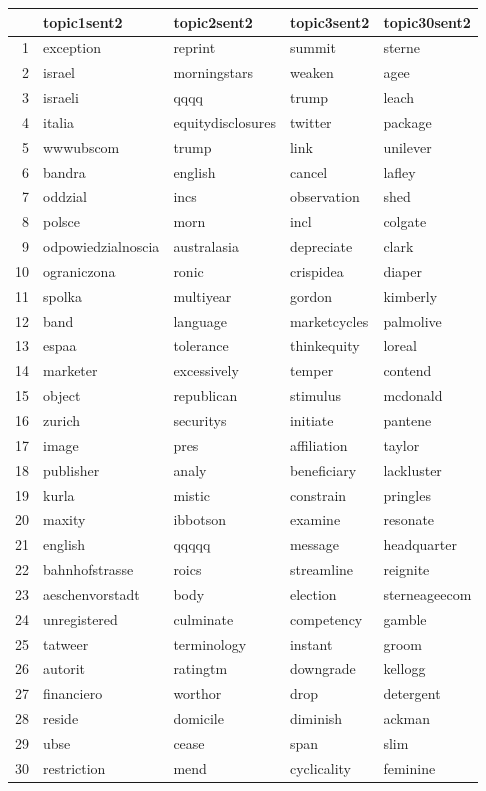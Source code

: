 \begin{table}[ht]
\centering
\begin{tabular}{rllll}
  \hline
 & topic1sent2 & topic2sent2 & topic3sent2 & topic30sent2 \\ 
  \hline
1 & exception & reprint & summit & sterne \\ 
  2 & israel & morningstars & weaken & agee \\ 
  3 & israeli & qqqq & trump & leach \\ 
  4 & italia & equitydisclosures & twitter & package \\ 
  5 & wwwubscom & trump & link & unilever \\ 
  6 & bandra & english & cancel & lafley \\ 
  7 & oddzial & incs & observation & shed \\ 
  8 & polsce & morn & incl & colgate \\ 
  9 & odpowiedzialnoscia & australasia & depreciate & clark \\ 
  10 & ograniczona & ronic & crispidea & diaper \\ 
  11 & spolka & multiyear & gordon & kimberly \\ 
  12 & band & language & marketcycles & palmolive \\ 
  13 & espaa & tolerance & thinkequity & loreal \\ 
  14 & marketer & excessively & temper & contend \\ 
  15 & object & republican & stimulus & mcdonald \\ 
  16 & zurich & securitys & initiate & pantene \\ 
  17 & image & pres & affiliation & taylor \\ 
  18 & publisher & analy & beneficiary & lackluster \\ 
  19 & kurla & mistic & constrain & pringles \\ 
  20 & maxity & ibbotson & examine & resonate \\ 
  21 & english & qqqqq & message & headquarter \\ 
  22 & bahnhofstrasse & roics & streamline & reignite \\ 
  23 & aeschenvorstadt & body & election & sterneageecom \\ 
  24 & unregistered & culminate & competency & gamble \\ 
  25 & tatweer & terminology & instant & groom \\ 
  26 & autorit & ratingtm & downgrade & kellogg \\ 
  27 & financiero & worthor & drop & detergent \\ 
  28 & reside & domicile & diminish & ackman \\ 
  29 & ubse & cease & span & slim \\ 
  30 & restriction & mend & cyclicality & feminine \\ 
   \hline
\end{tabular}
\end{table}


